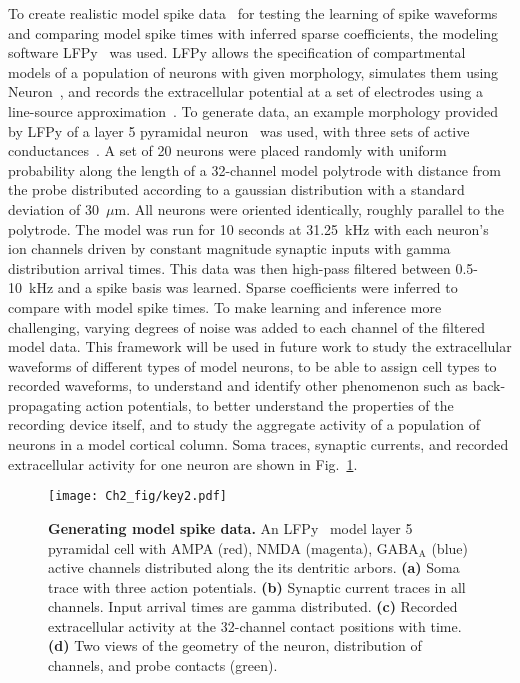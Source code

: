 To create realistic model spike data~\cite{einevoll:2011sp} for
testing the learning of spike waveforms and comparing model spike
times with inferred sparse coefficients, the modeling software
LFPy~\cite{linden2011} was used. LFPy allows the specification of
compartmental models of a population of neurons with given morphology,
simulates them using Neuron~\cite{hines1997neuron}, and records the
extracellular potential at a set of electrodes using a line-source
approximation~\cite{Holt:fk}. To generate data, an example morphology
provided by LFPy of a layer 5 pyramidal neuron~\cite{Mainen:1995uq}
was used, with three sets of active
conductances~\cite{Hendrickson:2011fk}. A set of 20 neurons were
placed randomly with uniform probability along the length of a
32-channel model polytrode with distance from the probe distributed
according to a gaussian distribution with a standard deviation of
30~$\mu$m. All neurons were oriented identically, roughly parallel to
the polytrode. The model was run for 10 seconds at 31.25~kHz with each
neuron's ion channels driven by constant magnitude synaptic inputs
with gamma distribution arrival times.  This data was then high-pass
filtered between 0.5-10~kHz and a spike basis was learned. Sparse
coefficients were inferred to compare with model spike times. To make
learning and inference more challenging, varying degrees of noise was
added to each channel of the filtered model data. This framework will
be used in future work to study the extracellular waveforms of
different types of model neurons, to be able to assign cell types to
recorded waveforms, to understand and identify other phenomenon such
as back-propagating action potentials, to better understand the
properties of the recording device itself, and to study the aggregate
activity of a population of neurons in a model cortical column. Soma
traces, synaptic currents, and recorded extracellular activity for one
neuron are shown in Fig.~\ref{fig:lfpyneuron}.

\begin{figure}[ht!]
  \centering
  \texttt{[image: Ch2\_fig/key2.pdf]}
  \caption{\textbf{Generating model spike data.} An
    LFPy~\cite{linden2011} model layer 5 pyramidal cell with AMPA
    (red), NMDA (magenta), GABA$_\mathrm{A}$ (blue) active channels
    distributed along the its dentritic arbors. \textbf{(a)} Soma
    trace with three action potentials. \textbf{(b)} Synaptic current
    traces in all channels. Input arrival times are gamma distributed.
    \textbf{(c)} Recorded extracellular activity at the 32-channel
    contact positions with time. \textbf{(d)} Two views of the
    geometry of the neuron, distribution of channels, and probe
    contacts (green).}
  \label{fig:lfpyneuron}
\end{figure}

